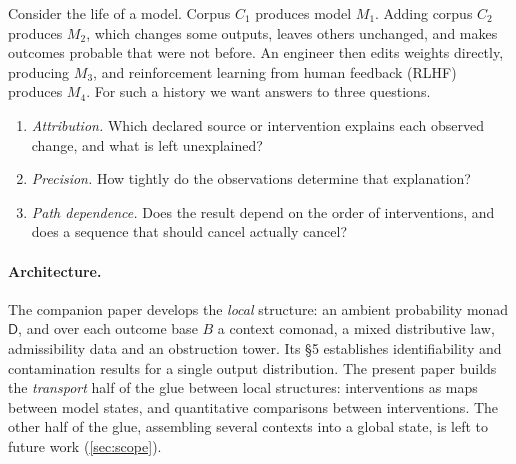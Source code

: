 \documentclass[11pt]{article}
\theoremstyle{definition}
\theoremstyle{remark}
\newcommand{\D}{\mathsf{D}}
\begin{document}
Consider the life of a model. Corpus $C_1$ produces model $M_1$. Adding corpus $C_2$ produces $M_2$,
which changes some outputs, leaves others unchanged, and makes outcomes probable that were not before.
An engineer then edits weights directly, producing $M_3$, and reinforcement learning from human
feedback (RLHF) produces $M_4$. For such a history we want answers to three questions.

\begin{enumerate}[label=(Q\arabic*),leftmargin=*]
\item \emph{Attribution.} Which declared source or intervention explains each observed change, and
  what is left unexplained?
\item \emph{Precision.} How tightly do the observations determine that explanation?
\item \emph{Path dependence.} Does the result depend on the order of interventions, and does a
  sequence that should cancel actually cancel?
\end{enumerate}

\paragraph{Architecture.} The companion paper \cite{Awasthi-Tower} develops the \emph{local} structure:
an ambient probability monad $\D$, and over each outcome base $B$ a context comonad, a mixed
distributive law, admissibility data and an obstruction tower. Its \S5 establishes identifiability and
contamination results for a single output distribution. The present paper builds the
\emph{transport} half of the glue between local structures: interventions as maps between model
states, and quantitative comparisons between interventions. The other half of the glue, assembling
several contexts into a global state, is left to future work (\cref{sec:scope}).
\end{document}

